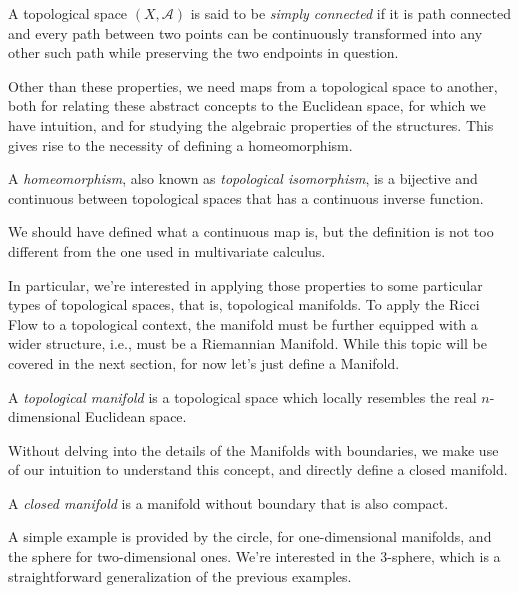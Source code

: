 \begin{definition}
    A topological space $(X,\mathcal{A})$ is said to be \emph{simply connected} if it is path connected and every path between two points can be continuously transformed into any other such path while preserving the two endpoints in question.
\end{definition}

Other than these properties, we need maps from a topological space to another, both for relating these abstract concepts to the Euclidean space, for which we have intuition, and for studying the algebraic properties of the structures. This gives rise to the necessity of defining a homeomorphism.

\begin{definition}[Homeomorphism]
    A \emph{homeomorphism}, also known as \emph{topological isomorphism}, is a bijective and continuous between topological spaces that has a continuous inverse function.
\end{definition}

We should have defined what a continuous map is, but the definition is not too different from the one used in multivariate calculus.

In particular, we're interested in applying those properties to some particular types of topological spaces, that is, topological manifolds. To apply the Ricci Flow to a topological context, the manifold must be further equipped with a wider structure, i.e., must be a Riemannian Manifold. While this topic will be covered in the next section, for now let's just define a Manifold.

\begin{definition}[Manifold]\label{def:manifold-prev}
    A \emph{topological manifold} is a topological space which locally resembles the real $n$-dimensional Euclidean space.
\end{definition}

Without delving into the details of the Manifolds with boundaries, we make use of our intuition to understand this concept, and directly define a closed manifold.

\begin{definition}
    A \emph{closed manifold} is a manifold without boundary that is also compact.
\end{definition}
A simple example is provided by the circle, for one-dimensional manifolds, and the sphere for two-dimensional ones. We're interested in the $3$-sphere, which is a straightforward generalization of the previous examples.

